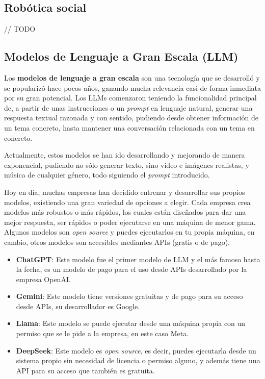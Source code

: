 \documentclass[../main.tex]{subfiles}
\begin{document}
\subsection{Robótica social}
// TODO
\blindtext

\subsection{Modelos de Lenguaje a Gran Escala (LLM)}
Los \textbf{modelos de lenguaje a gran escala} son una tecnología que se desarrolló y se popularizó hace pocos años, ganando mucha relevancia casi de forma inmediata
por su gran potencial. Los LLMs comenzaron teniendo la funcionalidad principal de, a partir de unas instrucciones o un \textit{prompt} en lenguaje natural, generar una respuesta
textual razonada y con sentido, pudiendo desde obtener información de un tema concreto, hasta mantener una conversación relacionada con un tema en concreto. 

Actualmente, estos modelos se han ido desarrollando y mejorando de manera exponencial, 
pudiendo no sólo generar texto, sino video e imágenes realistas, y música de cualquier género, todo siguiendo el \textit{prompt} introducido. 

Hoy en día, muchas empresas han decidido entrenar y desarrollar sus propios modelos, existiendo una gran variedad de opciones a elegir. Cada empresa crea modelos
más robustos o más rápidos, los cuales están diseñados para dar una mejor respuesta, ser rápidos o poder ejecutarse en una máquina de menor gama. Algunos modelos son 
\textit{open source} y puedes ejecutarlos en tu propia máquina, en cambio, otros modelos son accesibles mediantes APIs (gratis o de pago).

\begin{itemize}
    \item \textbf{ChatGPT}: Este modelo fue el primer modelo de LLM y el más famoso hasta la fecha, es un modelo de pago para el uso desde APIs desarrollado por la empresa OpenAI.
    \item \textbf{Gemini}: Este modelo tiene versiones gratuitas y de pago para su acceso desde APIs, su desarrollador es Google.
    \item \textbf{Llama}: Este modelo se puede ejecutar desde una máquina propia con un permiso que se le pide a la empresa, en este caso Meta.
    \item \textbf{DeepSeek}: Este modelo es \textit{open source}, es decir, puedes ejecutarla desde un sistema propio sin necesidad de licencia o permiso alguno, y además tiene una API para su acceso
    que también es gratuita.
\end{itemize}
\end{document}
